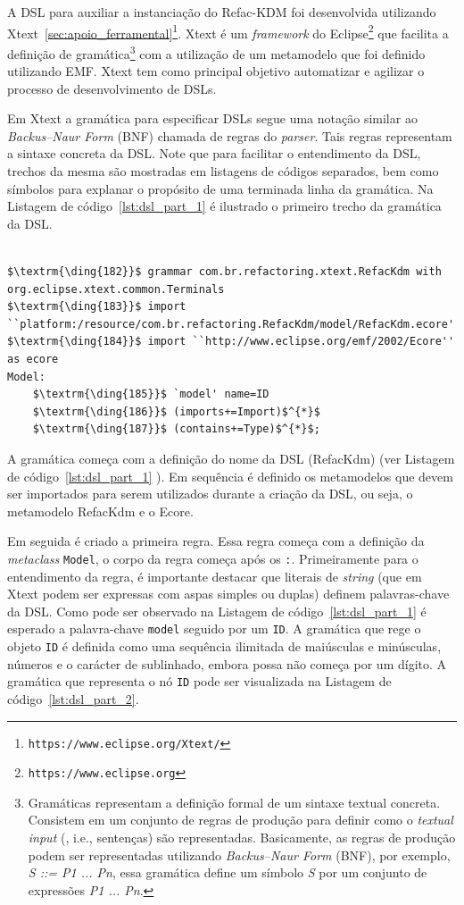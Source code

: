 A DSL para auxiliar a instanciação do Refac-KDM foi desenvolvida utilizando Xtext~\ref{sec:apoio_ferramental}\footnote{\texttt{https://www.eclipse.org/Xtext/}}. Xtext é um \textit{framework} do Eclipse\footnote{\texttt{https://www.eclipse.org}} que facilita a definição de gramática\footnote{Gramáticas representam a definição formal de um sintaxe textual concreta. Consistem em um conjunto de regras de produção para definir como o \textit{textual input} (, i.e., sentenças) são representadas. Basicamente, as regras de produção podem ser representadas utilizando \textit{Backus–Naur Form} (BNF), por exemplo, \textit{S ::= P1 ... Pn}, essa gramática define um símbolo \textit{S} por um conjunto de expressões \textit{P1 ... Pn}.} 
com a utilização de um metamodelo que foi definido utilizando EMF. Xtext tem como principal objetivo automatizar e agilizar o processo de desenvolvimento de DSLs.

 Em Xtext a gramática para especificar DSLs segue uma notação similar ao \textit{Backus–Naur Form} (BNF) chamada de regras do \textit{parser}. Tais regras representam a sintaxe concreta da DSL. Note que para facilitar o entendimento da DSL, trechos da mesma são mostradas em listagens de códigos separados, bem como símbolos para explanar o propósito de uma terminada linha da gramática. Na Listagem de código~\ref{lst:dsl_part_1} é ilustrado o primeiro trecho da gramática da DSL. 

\begin{lstlisting}[language=Xtext, frame=single, basicstyle={\scriptsize}, mathescape=true, label={lst:dsl_part_1}, caption={Gramática da DSL - parte 1}]
	
$\textrm{\ding{182}}$ grammar com.br.refactoring.xtext.RefacKdm with org.eclipse.xtext.common.Terminals 
$\textrm{\ding{183}}$ import ``platform:/resource/com.br.refactoring.RefacKdm/model/RefacKdm.ecore'
$\textrm{\ding{184}}$ import ``http://www.eclipse.org/emf/2002/Ecore'' as ecore
Model: 
	$\textrm{\ding{185}}$ `model' name=ID
	$\textrm{\ding{186}}$ (imports+=Import)$^{*}$
	$\textrm{\ding{187}}$ (contains+=Type)$^{*}$;
\end{lstlisting}

A gramática começa com a definição do nome da DSL (RefacKdm) (ver Listagem de código~\ref{lst:dsl_part_1} ). Em sequência é definido os metamodelos que devem ser importados para serem utilizados durante a criação da DSL, ou seja, o metamodelo RefacKdm  e o Ecore.

Em seguida é criado a primeira regra. Essa regra começa com a definição da \textit{metaclass} \texttt{Model}, o corpo da regra começa após os \texttt{:}. Primeiramente para o entendimento da regra, é importante destacar que literais de \textit{string} (que em Xtext podem ser expressas com aspas simples ou duplas) definem palavras-chave da DSL. Como pode ser observado na Listagem de código~\ref{lst:dsl_part_1} é esperado a palavra-chave \texttt{model} seguido por um \texttt{ID}. A gramática que rege o objeto \texttt{ID} é definida como uma sequência ilimitada de maiúsculas e minúsculas, números e o carácter de sublinhado, embora possa não começa por um dígito. A gramática que representa o nó \texttt{ID} pode ser visualizada na Listagem de código~\ref{lst:dsl_part_2}. 

